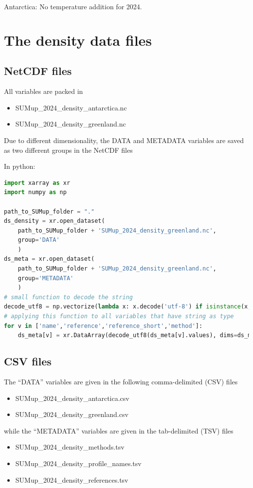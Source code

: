 \documentclass[journal abbreviation, manuscript]{copernicus}
\begin{document}
\bigskip

Antarctica: No temperature addition for 2024.

\section{The density data files}
\subsection{NetCDF files}

All variables are packed in 
\begin{itemize}
\item SUMup\_2024\_density\_antarctica.nc
\item SUMup\_2024\_density\_greenland.nc
\end{itemize}

Due to different dimensionality, the DATA and METADATA variables are saved as two different groups in the NetCDF files

In python:
\begin{lstlisting}[language=python]
import xarray as xr
import numpy as np

path_to_SUMup_folder = "."
ds_density = xr.open_dataset(
    path_to_SUMup_folder + 'SUMup_2024_density_greenland.nc', 
    group='DATA'
    )
ds_meta = xr.open_dataset(
    path_to_SUMup_folder + 'SUMup_2024_density_greenland.nc',
    group='METADATA'
    )
# small function to decode the string
decode_utf8 = np.vectorize(lambda x: x.decode('utf-8') if isinstance(x, bytes) else x)
# applying this function to all variables that have string as type
for v in ['name','reference','reference_short','method']:
    ds_meta[v] = xr.DataArray(decode_utf8(ds_meta[v].values), dims=ds_meta[v].dims)
\end{lstlisting} 


\subsection{CSV files}
The “DATA” variables are given in the following comma-delimited (CSV) files 
\begin{itemize}
\item SUMup\_2024\_density\_antarctica.csv 
\item SUMup\_2024\_density\_greenland.csv 
\end{itemize}

while the “METADATA” variables are given in the tab-delimited (TSV) files
\begin{itemize}
\item SUMup\_2024\_density\_methods.tsv
\item SUMup\_2024\_density\_profile\_names.tsv
\item SUMup\_2024\_density\_references.tsv
\end{itemize}
\end{document}
